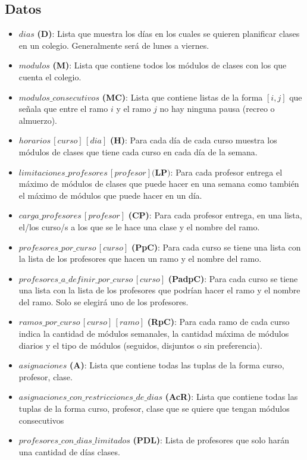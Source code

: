 \documentclass[letterpaper]{article}
\begin{document}
\subsection{Datos}
\begin{itemize}
    \item $dias$ \textbf{(D)}: Lista que muestra los días en los cuales se quieren planificar clases en un colegio. Generalmente será de lunes a viernes.
    \item $modulos$ \textbf{(M)}: Lista que contiene todos los módulos de clases con los que cuenta el colegio.
    \item $modulos\_consecutivos$ \textbf{(MC)}: Lista que contiene listas de la forma $[i,j]$ que señala que entre el ramo $i$ y el ramo $j$ no hay ninguna pausa (recreo o almuerzo).
    \item $horarios\,[curso]\,[dia]$ \textbf{(H)}: Para cada día de cada curso muestra los módulos de clases que tiene cada curso en cada día de la semana.
    \item $limitaciones\_profesores\,[profesor] \textbf{(LP)}$: Para cada profesor entrega el máximo de módulos de clases que puede hacer en una semana como también el máximo de módulos que puede hacer en un día.
    \item $carga\_profesores\,[profesor]$ \textbf{(CP)}: Para cada profesor entrega, en una lista, el/los curso/s a los que se le hace una clase y el nombre del ramo.
    \item $profesores\_por\_curso\,[curso]$ \textbf{(PpC)}: Para cada curso se tiene una lista con la lista de los profesores que hacen un ramo y el nombre del ramo.
    \item $profesores\_a\_definir\_por\_curso\,[curso]$ \textbf{(PadpC)}: Para cada curso se tiene una lista con la lista de los profesores que podrían hacer el ramo y el nombre del ramo. Solo se elegirá uno de los profesores.
    \item $ramos\_por\_curso \, [curso] \, [ramo]$ \textbf{(RpC)}: Para cada ramo de cada curso indica la cantidad de módulos semanales, la cantidad máxima de módulos diarios y el tipo de módulos (seguidos, disjuntos o sin preferencia).
    \item $asignaciones$ \textbf{(A)}: Lista que contiene todas las tuplas de la forma curso, profesor, clase.
    \item $asignaciones\_con\_restricciones\_de\_dias$ \textbf{(AcR)}: Lista que contiene todas las tuplas de la forma curso, profesor, clase que se quiere que tengan módulos consecutivos
    \item $profesores\_con\_dias\_limitados$ \textbf{(PDL)}: Lista de profesores que solo harán una cantidad de días clases.

\end{itemize}
\end{document}
